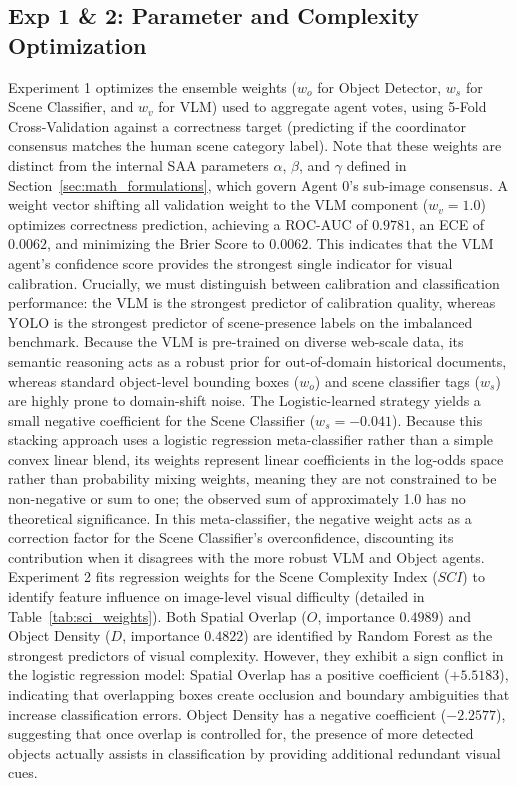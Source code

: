 \documentclass[11pt,a4paper]{article}
\begin{document}
\subsection{Exp 1 \& 2: Parameter and Complexity Optimization}\label{sec:weights_optimization}
Experiment 1 optimizes the ensemble weights ($w_o$ for Object Detector, $w_s$ for Scene Classifier, and $w_v$ for VLM) used to aggregate agent votes, using 5-Fold Cross-Validation against a correctness target (predicting if the coordinator consensus matches the human scene category label). Note that these weights are distinct from the internal SAA parameters $\alpha$, $\beta$, and $\gamma$ defined in Section~\ref{sec:math_formulations}, which govern Agent 0's sub-image consensus. A weight vector shifting all validation weight to the VLM component ($w_v=1.0$) optimizes correctness prediction, achieving a ROC-AUC of $0.9781$, an ECE of $0.0062$, and minimizing the Brier Score to $0.0062$. This indicates that the VLM agent's confidence score provides the strongest single indicator for visual calibration. Crucially, we must distinguish between calibration and classification performance: the VLM is the strongest predictor of calibration quality, whereas YOLO is the strongest predictor of scene-presence labels on the imbalanced benchmark. Because the VLM is pre-trained on diverse web-scale data, its semantic reasoning acts as a robust prior for out-of-domain historical documents, whereas standard object-level bounding boxes ($w_o$) and scene classifier tags ($w_s$) are highly prone to domain-shift noise. The Logistic-learned strategy yields a small negative coefficient for the Scene Classifier ($w_s = -0.041$). Because this stacking approach uses a logistic regression meta-classifier rather than a simple convex linear blend, its weights represent linear coefficients in the log-odds space rather than probability mixing weights, meaning they are not constrained to be non-negative or sum to one; the observed sum of approximately 1.0 has no theoretical significance. In this meta-classifier, the negative weight acts as a correction factor for the Scene Classifier's overconfidence, discounting its contribution when it disagrees with the more robust VLM and Object agents.
Experiment 2 fits regression weights for the Scene Complexity Index ($SCI$) to identify feature influence on image-level visual difficulty (detailed in Table~\ref{tab:sci_weights}). Both Spatial Overlap ($O$, importance $0.4989$) and Object Density ($D$, importance $0.4822$) are identified by Random Forest as the strongest predictors of visual complexity. However, they exhibit a sign conflict in the logistic regression model: Spatial Overlap has a positive coefficient ($+5.5183$), indicating that overlapping boxes create occlusion and boundary ambiguities that increase classification errors. Object Density has a negative coefficient ($-2.2577$), suggesting that once overlap is controlled for, the presence of more detected objects actually assists in classification by providing additional redundant visual cues.
\end{document}
